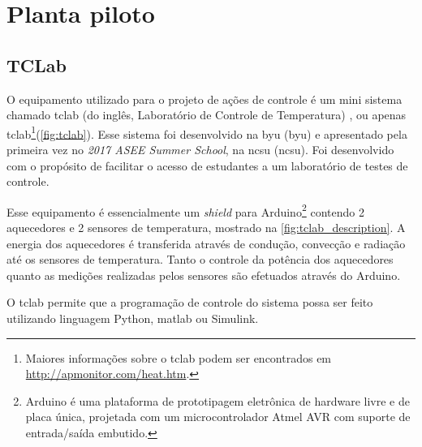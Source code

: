 
\chapter{Planta piloto}
\label{ch:planta_piloto}

\section{TCLab}
\label{sec:tclab}

O equipamento utilizado para o projeto de ações de controle é um mini sistema chamado \acrlong{tclab}
(do inglês, Laboratório de Controle de Temperatura) , ou apenas \acrshort{tclab}\footnote{                       %
	Maiores informações sobre o \acrshort{tclab} podem ser encontrados em
	\href{http://apmonitor.com/heat.htm}{http://apmonitor.com/heat.htm}.
}(\cref{fig:tclab}). Esse sistema foi desenvolvido na \acrlong{byu} (\acrshort{byu}) e apresentado
pela primeira vez no \textit{2017 ASEE Summer School}, na \acrlong{ncsu} (\acrshort{ncsu}). Foi
desenvolvido com o propósito de facilitar o acesso de estudantes a um laboratório de testes de controle.

Esse equipamento é essencialmente um \textit{shield} para Arduino\footnote{
    Arduino é uma plataforma de prototipagem eletrônica de hardware livre e de placa única, projetada com um    %
    microcontrolador Atmel AVR com suporte de entrada/saída embutido.                                           %
} contendo 2 aquecedores e 2 sensores de temperatura, mostrado na \cref{fig:tclab_description}. A energia dos aquecedores é
transferida através de condução, convecção e radiação até os sensores de temperatura. Tanto o controle da
potência dos aquecedores quanto as medições realizadas pelos sensores são efetuados através do Arduino.

O \acrshort{tclab} permite que a programação de controle do sistema possa ser feito utilizando linguagem Python,
\acrshort{matlab} ou Simulink.

